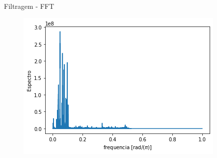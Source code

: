 \documentclass{beamer}
\begin{document}
\begin{frame}{Filtragem - FFT}
    \begin{figure}
        \centering
        \includegraphics[scale = .8]{filtered_fourier.png}
    \end{figure}
\end{frame}
\end{document}
